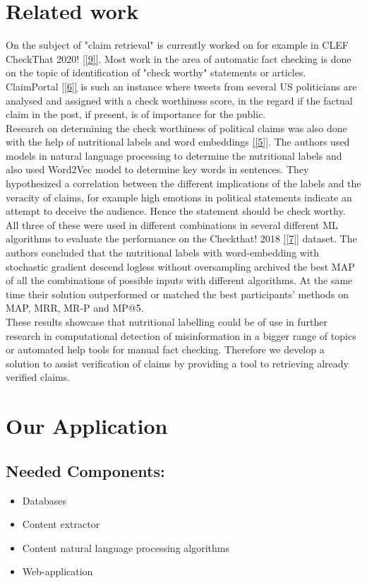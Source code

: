 \documentclass[10pt]{article}
\begin{document}
\section{Related work}
On the subject of "claim retrieval" is currently worked on for example in CLEF CheckThat 2020! \ref{[9]}. 
Most work in the area of automatic fact checking is done on the topic of identification of "check worthy" statements or articles.
ClaimPortal \ref{[6]} is such an instance where tweets from several US politicians are analysed and assigned with a check worthiness  score, in the regard if the factual claim in the post, if present, is of importance for the public.\\
Research on determining the check worthiness of political claims was also done with the help of nutritional labels and word embeddings \ref{[5]}.
The authors used models in natural language processing to determine the nutritional labels and also used Word2Vec model to determine key words in sentences.
They hypothesized a correlation between the different implications of the labels and the veracity of claims, for example high emotions in political statements indicate an attempt to deceive the audience.
Hence the statement should be check worthy. 
All three of these were used in different combinations in several different ML algorithms to evaluate the performance on the Checkthat! 2018 \ref{[7]} dataset.
The authors concluded that the nutritional labels with word-embedding with stochastic gradient descend logless without oversampling  archived the best MAP of all the combinations of possible inputs with different algorithms. At the same time their solution outperformed or matched the best participants' methods on MAP, MRR, MR-P and MP@5.\\
These results showcase that nutritional labelling could be of use in further research in computational detection of misinformation in a bigger range of topics or automated help tools for manual fact checking.
Therefore we develop a solution to assist verification of claims by providing a tool to retrieving already verified claims.

\section{Our Application}
\subsection{Needed Components:}
\begin{itemize}
\item Databases
\item Content extractor
\item Content natural language processing algorithms
\item Web-application
\end{itemize}
\end{document}
